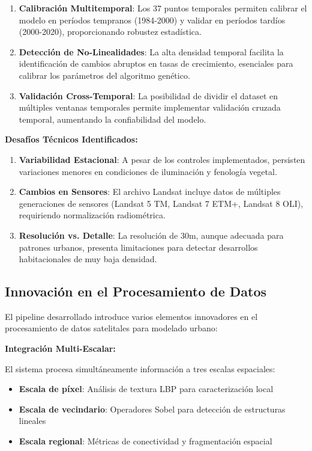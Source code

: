 \documentclass[12pt,letterpaper]{article}
\begin{document}
\begin{enumerate}
\item \textbf{Calibración Multitemporal}: Los 37 puntos temporales permiten calibrar el modelo en períodos tempranos (1984-2000) y validar en períodos tardíos (2000-2020), proporcionando robustez estadística.

\item \textbf{Detección de No-Linealidades}: La alta densidad temporal facilita la identificación de cambios abruptos en tasas de crecimiento, esenciales para calibrar los parámetros del algoritmo genético.

\item \textbf{Validación Cross-Temporal}: La posibilidad de dividir el dataset en múltiples ventanas temporales permite implementar validación cruzada temporal, aumentando la confiabilidad del modelo.
\end{enumerate}

\textbf{Desafíos Técnicos Identificados:}

\begin{enumerate}
\item \textbf{Variabilidad Estacional}: A pesar de los controles implementados, persisten variaciones menores en condiciones de iluminación y fenología vegetal.

\item \textbf{Cambios en Sensores}: El archivo Landsat incluye datos de múltiples generaciones de sensores (Landsat 5 TM, Landsat 7 ETM+, Landsat 8 OLI), requiriendo normalización radiométrica.

\item \textbf{Resolución vs. Detalle}: La resolución de 30m, aunque adecuada para patrones urbanos, presenta limitaciones para detectar desarrollos habitacionales de muy baja densidad.
\end{enumerate}

\subsection{Innovación en el Procesamiento de Datos}

El pipeline desarrollado introduce varios elementos innovadores en el procesamiento de datos satelitales para modelado urbano:

\textbf{Integración Multi-Escalar:}

El sistema procesa simultáneamente información a tres escalas espaciales:
\begin{itemize}
\item \textbf{Escala de píxel}: Análisis de textura LBP para caracterización local
\item \textbf{Escala de vecindario}: Operadores Sobel para detección de estructuras lineales
\item \textbf{Escala regional}: Métricas de conectividad y fragmentación espacial
\end{itemize}
\end{document}
